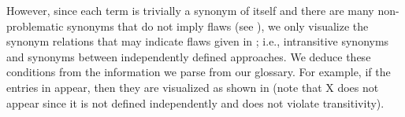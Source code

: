     \clearpage
    
    \ExampleParChdGraphs{}
    \clearpage
\fi%
However, since each term is trivially a synonym of itself and there are many
non-problematic synonyms that do not imply flaws (see ),
we only visualize the synonym relations that may indicate flaws given in
; i.e., intransitive synonyms and synonyms between
independently defined approaches.
\ifnotpaper
    We deduce these conditions from the information we parse from our glossary.
    For example, if the entries in  appear, then
    they are visualized as shown in  (note that X
    does not appear since it is not defined independently and does not violate
    transitivity).

